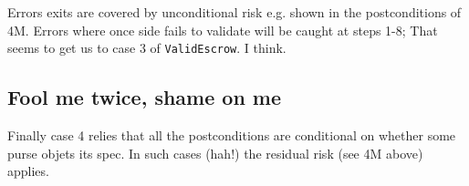 Errors exits are covered by unconditional risk e.g. shown in the postconditions of 4M.
Errors where once side fails to validate will be caught at steps 1-8;
That seems to get us to case 3 of \lstinline+ValidEscrow+.  I think.

\subsection{Fool me twice, shame on me}

Finally case 4 relies that all the postconditions are conditional on whether some purse objets its spec.
In such cases (hah!) the residual risk (see 4M above) applies.

